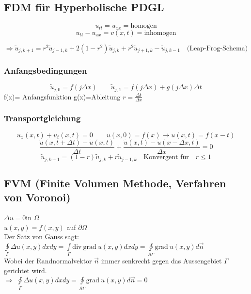 \subsection{FDM für Hyperbolische PDGL}

$$u_{tt}=u_{xx} = \text{homogen}$$
$$u_{tt} -u_{xx}= v(x,t) = \text{inhomogen}$$

$$\Longrightarrow \tilde{u}_{j,k+1}=r^2 \tilde{u}_{j-1,k} + 2(1-r^2)\tilde{u}_{j,k}+ r^2
\tilde{u}_{j+1,k}-\tilde{u}_{j,k-1} \quad \text{(Leap-Frog-Schema)}$$
\subsubsection{Anfangsbedingungen}
$$\tilde{u}_{j,0} = f(j\Delta x) \qquad \tilde{u}_{j,1}= f(j\Delta x) + g(j\Delta x)\Delta t$$
f(x)= Anfangsfunktion \qquad g(x)=Ableitung \qquad $r = \frac{\Delta t}{\Delta x}$

\subsubsection{Transportgleichung}
$$u_x(x,t) + u_t(x, t) = 0 \qquad u(x,0)=f(x) \longrightarrow u(x,t)=f(x-t)$$
$$\frac{\tilde{u}(x,t+\Delta t)-\tilde{u}(x,t)}{\Delta t} + \frac{\tilde{u}(x,t) - \tilde{u}(x-\Delta x,
t)}{\Delta x} = 0 $$
$$\tilde{u}_{j,k+1}=(1-r)\tilde{u}_{j,k} + r\tilde{u}_{j-1,k} \quad \text{Konvergent für} \quad r \leq 1$$

\subsection{FVM (Finite Volumen Methode, Verfahren von Voronoi)}
$\Delta u=0$\qquad in \quad$\Omega$\\
$u(x,y)=f(x,y)$ \qquad auf \quad$\partial\Omega$\\
Der Satz von Gauss sagt: $\boxed{\oint\limits_{\Gamma}{\Delta u(x,y) dx dy}=\int\limits_{\Gamma}{\mathrm{div}~\mathrm{grad}~ u(x,y) dx dy}=\oint\limits_{\partial\Gamma}{\mathrm{grad}~ u(x,y) d\vec{n}}}$\\


Wobei der Randnormalvektor $\vec{n}$ immer senkrecht gegen das Aussengebiet $\Gamma$ gerichtet wird.\\

$\Rightarrow$ $\oint\limits_{\Gamma}{\Delta u(x,y) dx dy}=\oint\limits_{\partial\Gamma}{\mathrm{grad}~ u(x,y) d\vec{n}}=0$

